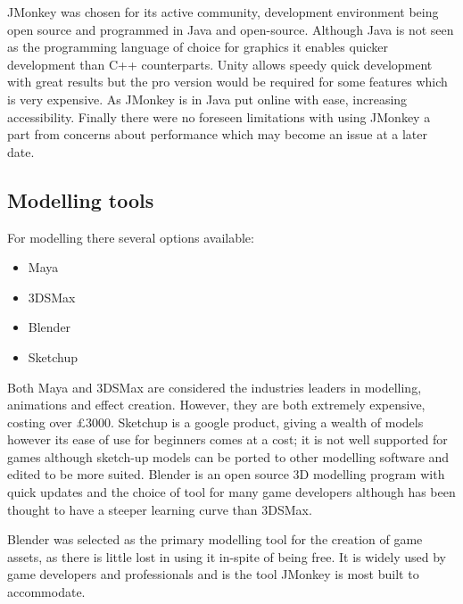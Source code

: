 JMonkey was chosen for its active community, development environment being open source and programmed in Java and open-source. Although Java is not seen as the programming language of choice for graphics it enables quicker development than C++ counterparts. Unity allows speedy quick development with great results but the pro version would be required for some features which is very expensive. As JMonkey is in Java put online with ease, increasing accessibility. Finally there were no foreseen limitations with using JMonkey a part from concerns about performance which may become an issue at a later date.

\subsection{Modelling tools}
For modelling there several options available:
\begin{itemize}
\item Maya
\item 3DSMax
\item Blender
\item Sketchup
\end{itemize}

Both Maya and 3DSMax are considered the industries leaders in modelling, animations and effect creation. However, they are both extremely expensive, costing over £3000. Sketchup is a google product, giving a wealth of models however its ease of use for beginners comes at a cost; it is not well supported for games although sketch-up models can be ported to other modelling software and edited to be more suited. Blender is an open source 3D modelling program with quick updates and the choice of tool for many game developers although has been thought to have a steeper learning curve than 3DSMax.

Blender was selected as the primary modelling tool for the creation of game assets, as there is little lost in using it in-spite of being free. It is widely used by game developers and professionals and is the tool JMonkey is most built to accommodate.